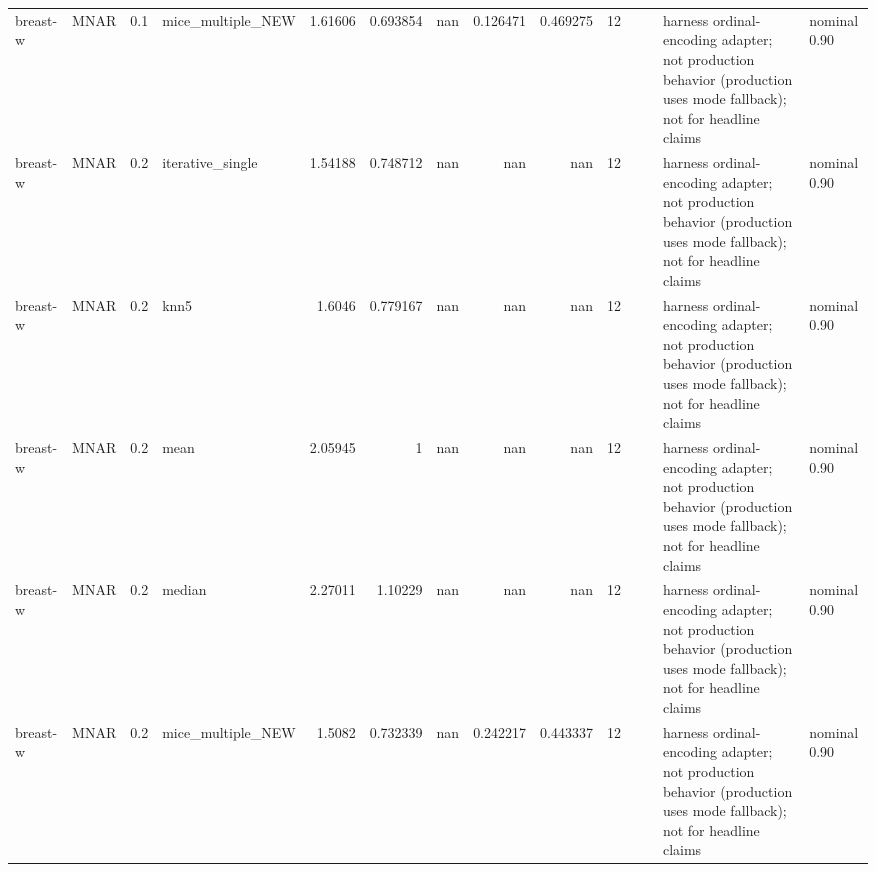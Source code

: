 \begin{table}[ht]
\begin{tabular}{llrlrrrrrrllll}
 breast-w             & MNAR        &         0.1 & mice\_multiple\_NEW &       1.61606  &             0.693854 &               nan        &                       0.126471 &                         0.469275 &        12 &                    &                                         & harness ordinal-encoding adapter; not production behavior (production uses mode fallback); not for headline claims & nominal 0.90              \\
 breast-w             & MNAR        &         0.2 & iterative\_single  &       1.54188  &             0.748712 &               nan        &                     nan        &                       nan        &        12 &                    &                                         & harness ordinal-encoding adapter; not production behavior (production uses mode fallback); not for headline claims & nominal 0.90              \\
 breast-w             & MNAR        &         0.2 & knn5              &       1.6046   &             0.779167 &               nan        &                     nan        &                       nan        &        12 &                    &                                         & harness ordinal-encoding adapter; not production behavior (production uses mode fallback); not for headline claims & nominal 0.90              \\
 breast-w             & MNAR        &         0.2 & mean              &       2.05945  &             1        &               nan        &                     nan        &                       nan        &        12 &                    &                                         & harness ordinal-encoding adapter; not production behavior (production uses mode fallback); not for headline claims & nominal 0.90              \\
 breast-w             & MNAR        &         0.2 & median            &       2.27011  &             1.10229  &               nan        &                     nan        &                       nan        &        12 &                    &                                         & harness ordinal-encoding adapter; not production behavior (production uses mode fallback); not for headline claims & nominal 0.90              \\
 breast-w             & MNAR        &         0.2 & mice\_multiple\_NEW &       1.5082   &             0.732339 &               nan        &                       0.242217 &                         0.443337 &        12 &                    &                                         & harness ordinal-encoding adapter; not production behavior (production uses mode fallback); not for headline claims & nominal 0.90              \\

\end{tabular}
\end{table}
